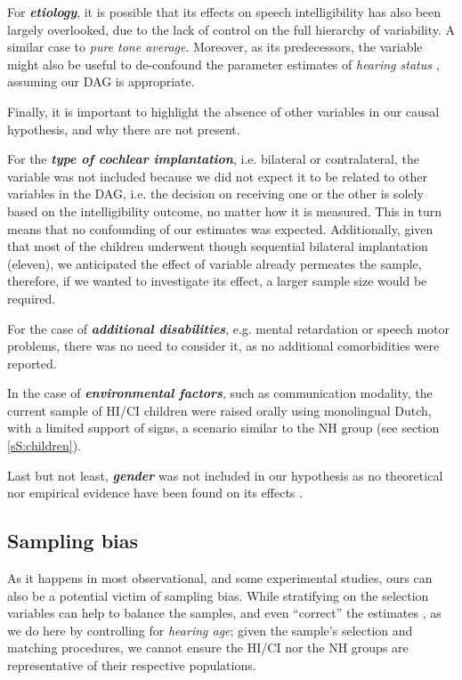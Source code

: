 For \textbf{\textit{etiology}}, it is possible that its effects on speech intelligibility has also been largely overlooked, due to the lack of control on the full hierarchy of variability. A similar case to \textit{pure tone average}. Moreover, as its predecessors, the variable might also be useful to de-confound the parameter estimates of \textit{hearing status} \cite{Cinelli_et_al_2021}, assuming our DAG is appropriate.

Finally, it is important to highlight the absence of other variables in our causal hypothesis, and why there are not present.

For the \textbf{\textit{type of cochlear implantation}}, i.e. bilateral or contralateral, the variable was not included because we did not expect it to be related to other variables in the DAG, i.e. the decision on receiving one or the other is solely based on the intelligibility outcome, no matter how it is measured. This in turn means that no confounding of our estimates was expected. Additionally, given that most of the children underwent though sequential bilateral implantation (eleven), we anticipated the effect of variable already permeates the sample, therefore, if we wanted to investigate its effect, a larger sample size would be required.

For the case of \textbf{\textit{additional disabilities}}, e.g. mental retardation or speech motor problems, there was no need to consider it, as no additional comorbidities were reported.

In the case of \textbf{\textit{environmental factors}}, such as communication modality, the current sample of HI/CI children were raised orally using monolingual Dutch, with a limited support of signs, a scenario similar to the NH group (see section \ref{sS:children}).

Last but not least, \textbf{\textit{gender}} was not included in our hypothesis as no theoretical nor empirical evidence have been found on its effects \cite{Boonen_et_al_2021}.
%
%
\subsection{Sampling bias} \label{sSA:sampling_bias}
%
As it happens in most observational, and some experimental studies, ours can also be a potential victim of sampling bias. While stratifying on the selection variables can help to balance the samples, and even ``correct'' the estimates \cite{Cinelli_et_al_2021, Deffner_et_al_2022}, as we do here by controlling for \textit{hearing age}; given the sample's selection and matching procedures, we cannot ensure the HI/CI nor the NH groups are representative of their respective populations. 

